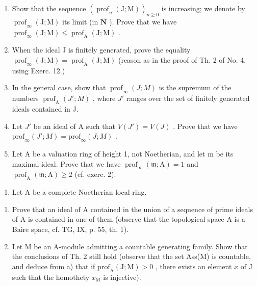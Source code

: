 \begin{enumerate}
\def\labelenumi{\alph{enumi})}
\item
  Show that the sequence \(\left(\operatorname{prof}_{n}(\mathrm{J};\mathrm{M})\right)_{n\geqslant0}\) is increasing; we denote by \(\operatorname{prof}_{\infty}(\mathrm{J};\mathrm{M})\) its limit (in \(\overline{\mathbf{N}}\) ). Prove that we have \(\operatorname{prof}_{\infty}(\mathrm{J};\mathrm{M})\leqslant\operatorname{prof}_{\mathrm{A}}(\mathrm{J};\mathrm{M})\) .
\item
  When the ideal J is finitely generated, prove the equality \(\operatorname{prof}_{\infty}(\mathrm{J};\mathrm{M})=\operatorname{prof}_{\mathrm{A}}(\mathrm{J};\mathrm{M})\) (reason as in the proof of Th. 2 of No. 4, using Exerc. 12.)
\item
  In the general case, show that \(\operatorname{prof}_{\infty}(J;M)\) is the supremum of the numbers \(\operatorname{prof}_{\mathrm{A}}(J';M)\) , where \(J'\) ranges over the set of finitely generated ideals contained in J.
\item
  Let \(J'\) be an ideal of A such that \(V(J') = V(J)\) . Prove that we have \(\text{prof}_{\infty}(J'; M) = \text{prof}_{\infty}(J; M)\) .
\item
  Let A be a valuation ring of height 1, not Noetherian, and let m be its maximal ideal. Prove that we have \(\operatorname{prof}_{\infty}(\mathfrak{m};\mathrm{A})=1\) and \(\operatorname{prof}_{\mathrm{A}}(\mathfrak{m};\mathrm{A})\geqslant2\) (cf. exerc. 2).
\end{enumerate}

\begin{enumerate}
\def\labelenumi{\arabic{enumi})}
\setcounter{enumi}{13}
\tightlist
\item
  Let A be a complete Noetherian local ring.
\end{enumerate}

\begin{enumerate}
\def\labelenumi{\alph{enumi})}
\item
  Prove that an ideal of A contained in the union of a sequence of prime ideals of A is contained in one of them (observe that the topological space A is a Baire space, cf. TG, IX, p. 55, th. 1).
\item
  Let M be an A-module admitting a countable generating family. Show that the conclusions of Th. 2 still hold (observe that the set Ass(M) is countable, and deduce from a) that if \(\mathrm{prof}_{\mathrm{A}}(\mathrm{J};\mathrm{M}) > 0\) , there exists an element \(x\) of J such that the homothety \(x_{\mathrm{M}}\) is injective).
\end{enumerate}

